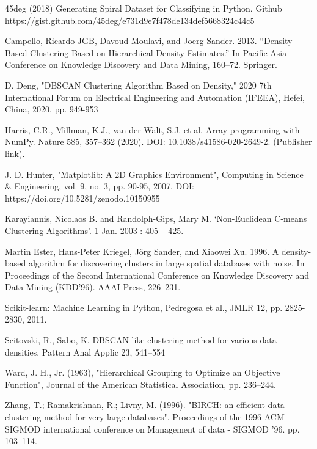 \documentclass{aa}
\begin{document}
\begin{thebibliography}{}
   45deg (2018) Generating Spiral Dataset for Classifying in Python. Github https://gist.github.com/45deg/e731d9e7f478de134def5668324c44c5
  
   Campello, Ricardo JGB, Davoud Moulavi, and Joerg Sander. 2013. “Density-Based Clustering Based on Hierarchical Density Estimates.” In Pacific-Asia Conference on Knowledge Discovery and Data Mining, 160–72. Springer.

    D. Deng, "DBSCAN Clustering Algorithm Based on Density," 2020 7th International Forum on Electrical Engineering and Automation (IFEEA), Hefei, China, 2020, pp. 949-953

    Harris, C.R., Millman, K.J., van der Walt, S.J. et al. Array programming with NumPy. Nature 585, 357–362 (2020). DOI: 10.1038/s41586-020-2649-2. (Publisher link).

    J. D. Hunter, "Matplotlib: A 2D Graphics Environment", Computing in Science & Engineering, vol. 9, no. 3, pp. 90-95, 2007. DOI: https://doi.org/10.5281/zenodo.10150955
   
    Karayiannis, Nicolaos B. and Randolph-Gips, Mary M. ‘Non-Euclidean C-means Clustering Algorithms’. 1 Jan. 2003 : 405 – 425.

    Martin Ester, Hans-Peter Kriegel, Jörg Sander, and Xiaowei Xu. 1996. A density-based algorithm for discovering clusters in large spatial databases with noise. In Proceedings of the Second International Conference on Knowledge Discovery and Data Mining (KDD'96). AAAI Press, 226–231.

    Scikit-learn: Machine Learning in Python, Pedregosa et al., JMLR 12, pp. 2825-2830, 2011.
   
    Scitovski, R., Sabo, K. DBSCAN-like clustering method for various data densities. Pattern Anal Applic 23, 541–554
   
    Ward, J. H., Jr. (1963), "Hierarchical Grouping to Optimize an Objective Function", Journal of the American Statistical Association, pp. 236–244.
  
    Zhang, T.; Ramakrishnan, R.; Livny, M. (1996). "BIRCH: an efficient data clustering method for very large databases". Proceedings of the 1996 ACM SIGMOD international conference on Management of data - SIGMOD '96. pp. 103–114.

\end{thebibliography}
\end{document}
